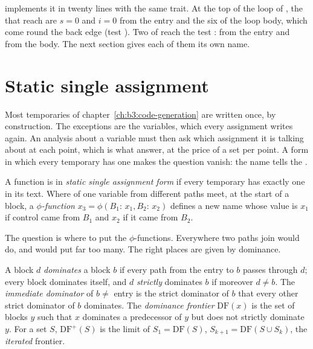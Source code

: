  implements it in twenty lines with the same trait. At the top of the loop of , the  that reach are $s = 0$ and $i = 0$ from the entry and the six of the loop body, which come round the back edge (test ). Two  of  reach the test : from the entry and from the body. The next section gives each of them its own name.

\section{Static single assignment}\label{sec:b3:program-optimisation:ssa}

Most temporaries of chapter~\ref{ch:b3:code-generation} are written once, by construction. The exceptions are the variables, which every assignment writes again. An analysis about a variable must then ask which assignment it is talking about at each point, which is what  answer, at the price of a set per point. A form in which every temporary has one  makes the question vanish: the name tells the .

\begin{definition}\label{def:b3:program-optimisation:ssa}
A function is in \emph{static single assignment form} if every temporary has exactly one  in its text. Where  of one variable from different paths meet, at the start of a block, a \emph{$\phi$-function} $x_3 = \phi(B_1{:}\,x_1, B_2{:}\,x_2)$ defines a new name whose value is $x_1$ if control came from $B_1$ and $x_2$ if it came from $B_2$.
\end{definition}

The question is where to put the $\phi$-functions. Everywhere two paths join would do, and would put far too many. The right places are given by dominance.

\begin{definition}\label{def:b3:program-optimisation:dominator}
A block $d$ \emph{dominates} a block $b$ if every path from the entry to $b$ passes through $d$; every block dominates itself, and $d$ \emph{strictly} dominates $b$ if moreover $d \ne b$. The \emph{immediate dominator} of $b \ne$ entry is the strict dominator of $b$ that every other strict dominator of $b$ dominates. The \emph{dominance frontier} $\mathrm{DF}(x)$ is the set of blocks $y$ such that $x$ dominates a predecessor of $y$ but does not strictly dominate $y$. For a set $S$, $\mathrm{DF}^{+}(S)$ is the limit of $S_1 = \mathrm{DF}(S)$, $S_{k+1} = \mathrm{DF}(S \cup S_k)$, the \emph{iterated} frontier.
\end{definition}

